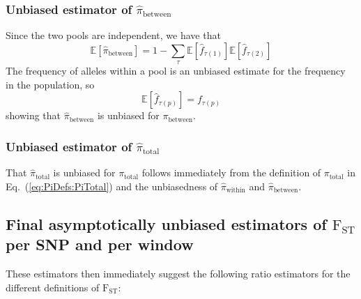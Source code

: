 \documentclass[a4paper,fontsize=9pt,DIV=14]{scrartcl}
\newcommand\eqnref[1]{Eq.~(\ref{#1})}
\newcommand{\empfreq}{\widehat{f}}
\begin{document}

\subsubsection*{Unbiased estimator of \texorpdfstring{$\widehat{\pi}_\text{between}$}{Pi Between}}
\label{supp:sec:FST:sub:EstimatorsPi:sub:PiBetween}

Since the two pools are independent, we have that
\[
\mathbb{E}\left[\widehat{\pi}_\text{between}\right] = 1- \sum_\tau \mathbb{E}\left[\empfreq_{\tau(1)}\right]\mathbb{E}\left[\empfreq_{\tau(2)}\right]
\]
The frequency of alleles within a pool is an unbiased estimate for the frequency in the population, so
\[
\mathbb{E}\left[\empfreq_{\tau(p)}\right] = f_{\tau(p)}
\]
showing that $\widehat{\pi}_\text{between}$ is unbiased for $\pi_\text{between}$.


\subsubsection*{Unbiased estimator of \texorpdfstring{$\widehat{\pi}_\text{total}$}{Pi Total}}
\label{supp:sec:FST:sub:EstimatorsPi:sub:PiTotal}

That $\widehat{\pi}_\text{total}$ is unbiased for $\pi_\text{total}$ follows immediately from the definition of $\pi_\text{total}$ in \eqnref{eq:PiDefs:PiTotal} and the unbiasedness of $\widehat{\pi}_\text{within}$ and $\widehat{\pi}_\text{between}$.


\subsection{Final asymptotically unbiased estimators of \texorpdfstring{$\text{F}_\text{ST}$}{FST} per SNP and per window}
\label{supp:sec:FST:sub:EstimatorFST}

These estimators then immediately suggest the following ratio estimators for the different definitions of $\text{F}_\text{ST}$:
\end{document}
